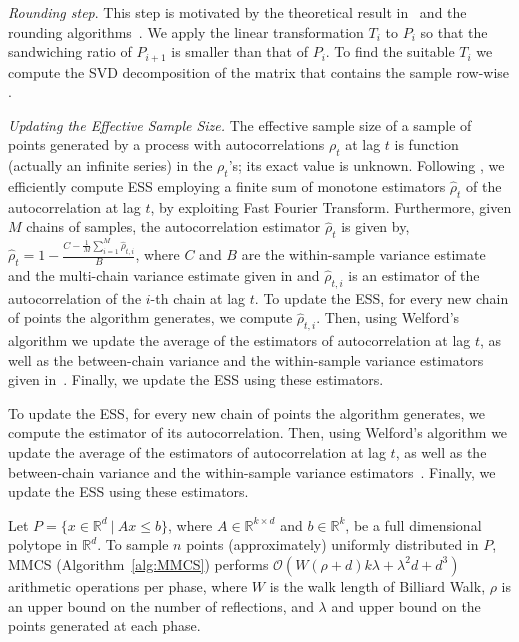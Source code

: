    \emph{Rounding step}. 
   This step is motivated by the theoretical result in~\citep{Adamczak10} and the rounding
   algorithms~\citep{Lovasz06, Cousins15}.
   We apply the linear transformation $T_i$ to $P_i$
   so that the sandwiching ratio of $P_{i+1}$ is smaller than that of $P_i$.
   To find the suitable $T_i$ we compute  the SVD decomposition of the matrix that contains the sample row-wise \citep{Shiri20}.
   
   \emph{Updating the  Effective Sample Size.}
   The effective sample size of a sample of points generated by a process with autocorrelations $\rho_t$ at lag $t$
   is function (actually an infinite series) in the $\rho_t$'s; its exact value is unknown.
   Following \citep{geyer92}, we efficiently compute ESS employing a finite sum of monotone estimators
   $\hat{\rho}_t$ of the autocorrelation at lag $t$, by exploiting Fast Fourier Transform. 
   Furthermore, given $M$ chains of samples, the autocorrelation estimator $\hat{\rho}_t$ is given by,
   $\hat{\rho}_t = 1 - \frac{C - \frac{1}{M}\sum_{i=1}^{M}\hat{\rho}_{t,i}}{B}$, 
   where $C$ and $B$ are the within-sample variance estimate and the multi-chain variance estimate given in \citep{Gelman92} and $\hat{\rho}_{t,i}$ is an estimator of the autocorrelation of the $i$-th chain at lag $t$.
   To update the ESS, for every new chain of points the algorithm generates, we compute
   $\hat{\rho}_{t,i}$. Then, using Welford's algorithm we
   update the average of the estimators of autocorrelation at lag $t$,
   as well as the between-chain variance and the within-sample variance estimators given in~\citep{Gelman92}.
   Finally, we update the ESS using these estimators.

   To update the ESS, for every new chain of points the algorithm generates, we compute
   the estimator of its autocorrelation. Then, using Welford's algorithm we
   update the average of the estimators of autocorrelation at lag $t$,
   as well as the between-chain variance and the within-sample variance estimators~\citep{Gelman92}.
   Finally, we update the ESS using these estimators.
   
   
   \begin{lem}
     \label{lem:mmcs_complexity}
     Let $P=\{x\in\mathbb{R}^d\ |\ Ax\leq b\}$, where $A\in\mathbb{R}^{k\times d}$ and
     $b\in\mathbb{R}^k$, be a full dimensional polytope in $\mathbb{R}^d$.
     To sample $n$ points  (approximately) uniformly distributed in $P$,
     MMCS (Algorithm~\ref{alg:MMCS}) performs
     $\mathcal{O}(W(\rho + d)k\lambda + \lambda^2d + d^3)$
     arithmetic operations per phase, where $W$ is the walk length
     of Billiard Walk,
     $\rho$ is an upper bound on the number of reflections, and $\lambda$
     and upper bound on the points generated at each phase.
   \end{lem}
   

